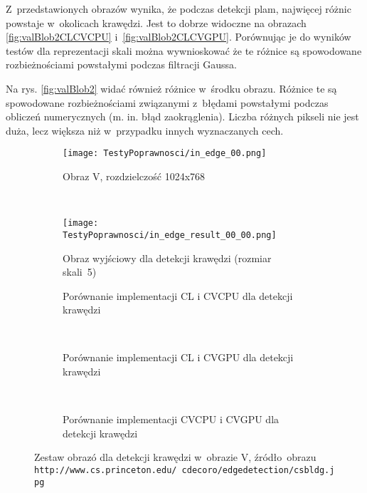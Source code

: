 Z~przedstawionych obrazów wynika, że podczas detekcji plam, najwięcej różnic powstaje w~okolicach krawędzi. Jest to dobrze widoczne na obrazach \ref{fig:valBlob2CLCVCPU} i~\ref{fig:valBlob2CLCVGPU}. Porównując je do wyników testów dla reprezentacji skali można wywnioskować że te różnice są spowodowane rozbieżnościami powstałymi podczas filtracji Gaussa.

Na rys. \ref{fig:valBlob2} widać również różnice w~środku obrazu. Różnice te są spowodowane rozbieżnościami związanymi z~błędami powstałymi podczas obliczeń numerycznych (m. in. błąd zaokrąglenia). Liczba różnych pikseli nie jest duża, lecz większa niż w~przypadku innych wyznaczanych cech.


\begin{figure}[H]

\begin{center}
\begin{subfigure}[t]{0.3\textwidth}
\texttt{[image: TestyPoprawnosci/in\_edge\_00.png]}
\caption{Obraz V, rozdzielczość 1024x768}
\label{fig:valEdge00}
\end{subfigure}
~
\begin{subfigure}[t]{0.3\textwidth}
\texttt{[image: TestyPoprawnosci/in\_edge\_result\_00\_00.png]}
\caption{Obraz wyjściowy dla detekcji krawędzi (rozmiar skali~5)}
\label{fig:valEdgeResult00}
\end{subfigure}
\end{center}

\begin{subfigure}[t]{0.3\textwidth}
	\centering
	\setlength\fboxsep{0pt}
	\setlength\fboxrule{0.5pt}
	\caption{Porównanie implementacji CL i CVCPU dla detekcji krawędzi}
	\label{fig:valEdge0CLCVCPU}
\end{subfigure}
~
\begin{subfigure}[t]{0.3\textwidth}
	\centering
	\setlength\fboxsep{0pt}
	\setlength\fboxrule{0.5pt}
	\caption{Porównanie implementacji CL i CVGPU dla detekcji krawędzi}
	\label{fig:valEdge0CLCVGPU}
\end{subfigure}
~
\begin{subfigure}[t]{0.3\textwidth}
	\centering
	\setlength\fboxsep{0pt}
	\setlength\fboxrule{0.5pt}
	\caption{Porównanie implementacji CVCPU i CVGPU dla detekcji krawędzi}
	\label{fig:valEdge0CVCPUCVGPU}                 
\end{subfigure}
\caption{Zestaw obrazó dla detekcji krawędzi w~obrazie V, \tiny{źródło~obrazu \texttt{http://www.cs.princeton.edu/~cdecoro/edgedetection/csbldg.jpg}}}

\label{fig:valEdge0}
\end{figure}

